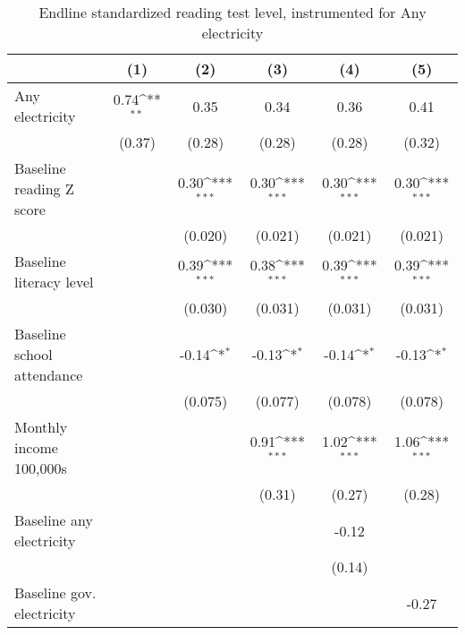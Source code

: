 \begin{table}[htbp]\centering
\def\sym#1{\ifmmode^{#1}\else\(^{#1}\)\fi}
\caption{Endline standardized reading test level, instrumented for Any electricity}
\begin{tabular*}{1\hsize}{@{\hskip\tabcolsep\extracolsep\fill}l*{5}{c}}
\toprule
                &\multicolumn{1}{c}{(1)}         &\multicolumn{1}{c}{(2)}         &\multicolumn{1}{c}{(3)}         &\multicolumn{1}{c}{(4)}         &\multicolumn{1}{c}{(5)}         \\
\midrule
Any electricity &     0.74\sym{**} &     0.35         &     0.34         &     0.36         &     0.41         \\
                &   (0.37)         &   (0.28)         &   (0.28)         &   (0.28)         &   (0.32)         \\
Baseline reading Z score&                  &     0.30\sym{***}&     0.30\sym{***}&     0.30\sym{***}&     0.30\sym{***}\\
                &                  &  (0.020)         &  (0.021)         &  (0.021)         &  (0.021)         \\
Baseline literacy level&                  &     0.39\sym{***}&     0.38\sym{***}&     0.39\sym{***}&     0.39\sym{***}\\
                &                  &  (0.030)         &  (0.031)         &  (0.031)         &  (0.031)         \\
Baseline school attendance&                  &    -0.14\sym{*}  &    -0.13\sym{*}  &    -0.14\sym{*}  &    -0.13\sym{*}  \\
                &                  &  (0.075)         &  (0.077)         &  (0.078)         &  (0.078)         \\
Monthly income 100,000s&                  &                  &     0.91\sym{***}&     1.02\sym{***}&     1.06\sym{***}\\
                &                  &                  &   (0.31)         &   (0.27)         &   (0.28)         \\
Baseline any electricity&                  &                  &                  &    -0.12         &                  \\
                &                  &                  &                  &   (0.14)         &                  \\
Baseline gov. electricity&                  &                  &                  &                  &    -0.27         \\

\end{tabular*}
\end{table}

